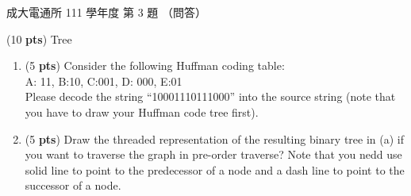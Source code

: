 \begin{pastexam}[label={px:ncku-111-cce-ds-03}]{成大電通所 111 學年度 第 3 題}
（問答）

(10 \textbf{pts}) Tree
\begin{enumerate}[label=\alph*.]
\item (5 \textbf{pts}) Consider the following Huffman coding table:\\
\hspace*{3em}A: 11, B:10, C:001, D: 000, E:01\\
Please decode the string ``10001110111000'' into the source string (note that you have to draw
your Huffman code tree first).
\item (5 \textbf{pts}) Draw the threaded representation of the resulting binary tree in (a) if you
want to traverse the graph in pre-order traverse? Note that you nedd use solid line to point to
the predecessor of a node and a dash line to point to the successor of a node.
\end{enumerate}
\end{pastexam}

